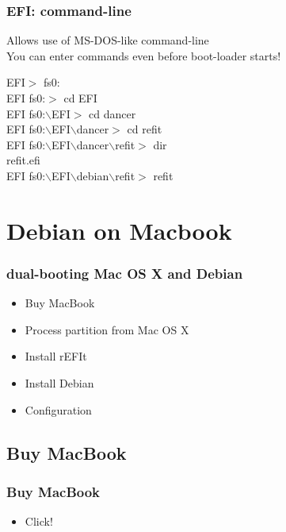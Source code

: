 \documentclass[cjk,dvipdfm]{beamer}
\begin{document}
\begin{frame}
\frametitle{EFI: command-line}

Allows use of MS-DOS-like command-line\\
You can enter commands even before boot-loader starts!

EFI$>$ fs0:\\
EFI fs0:$>$ cd EFI\\
EFI fs0:$\backslash{}$EFI$>$ cd dancer\\
EFI fs0:$\backslash{}$EFI$\backslash{}$dancer$>$ cd refit\\
EFI fs0:$\backslash{}$EFI$\backslash{}$dancer$\backslash{}$refit$>$ dir\\
refit.efi\\
 EFI fs0:$\backslash{}$EFI$\backslash{}$debian$\backslash{}$refit$>$ refit

\end{frame}

\section{Debian on Macbook}

\begin{frame}
 \frametitle{dual-booting Mac OS X and Debian}
 \begin{minipage}{0.5\hsize}
  \begin{itemize}
   \item Buy MacBook
   \item Process partition from Mac OS X
   \item Install rEFIt 
   \item Install Debian
   \item Configuration
  \end{itemize}
 \end{minipage}
\end{frame}

\subsection{Buy MacBook} 

\begin{frame}
 \frametitle{Buy MacBook}
 \begin{minipage}{0.5\hsize}
  \begin{itemize}
   \item Click!
  \end{itemize}
 \end{minipage}
\end{frame}
\end{document}
